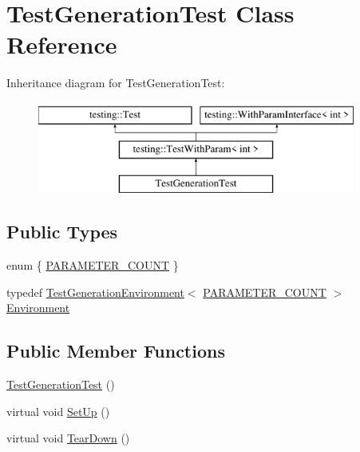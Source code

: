 \hypertarget{classTestGenerationTest}{}\section{Test\+Generation\+Test Class Reference}
\label{classTestGenerationTest}
Inheritance diagram for Test\+Generation\+Test\+:\begin{figure}[H]
\begin{center}
\leavevmode
\includegraphics[height=3.000000cm]{classTestGenerationTest}
\end{center}
\end{figure}
\subsection*{Public Types}
\begin{DoxyCompactItemize}
\item 
enum \{ \mbox{\hyperlink{classTestGenerationTest_a42cdf2314eecc9a27690ee4a3da82a7fafd4242eef0a2666840480cf79613e7e1}{P\+A\+R\+A\+M\+E\+T\+E\+R\+\_\+\+C\+O\+U\+NT}}
 \}
\item 
typedef \mbox{\hyperlink{classTestGenerationEnvironment}{Test\+Generation\+Environment}}$<$ \mbox{\hyperlink{classTestGenerationTest_a42cdf2314eecc9a27690ee4a3da82a7fafd4242eef0a2666840480cf79613e7e1}{P\+A\+R\+A\+M\+E\+T\+E\+R\+\_\+\+C\+O\+U\+NT}} $>$ \mbox{\hyperlink{classTestGenerationTest_aeff004d79bbb376d7acecd28f9fb71c6}{Environment}}
\end{DoxyCompactItemize}
\subsection*{Public Member Functions}
\begin{DoxyCompactItemize}
\item 
\mbox{\hyperlink{classTestGenerationTest_ad243bf217fa672ce25675b8bd86e285e}{Test\+Generation\+Test}} ()
\item 
virtual void \mbox{\hyperlink{classTestGenerationTest_a9705d633439b360b338503599a360ea8}{Set\+Up}} ()
\item 
virtual void \mbox{\hyperlink{classTestGenerationTest_a447190a74b306b4b94c25fed474d6029}{Tear\+Down}} ()
\end{DoxyCompactItemize}
